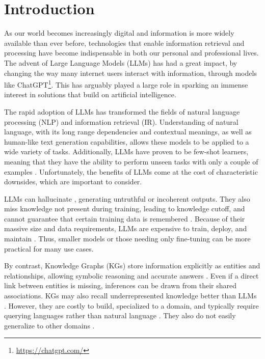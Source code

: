 \documentclass[pdflatex,sn-mathphys-num]{sn-jnl}%
\theoremstyle{thmstyleone}%
\theoremstyle{thmstyletwo}%
\theoremstyle{thmstylethree}%
\begin{document}



\maketitle
\section{Introduction}
\label{sec:intro}

As our world becomes increasingly digital and information is more widely available than ever before, technologies that enable information retrieval and processing have become indispensable in both our personal and professional lives. The advent of Large Language Models (LLMs) has had a great impact, by changing the way many internet users interact with information, through models like ChatGPT\footnote{\url{https://chatgpt.com/}}. This has arguably played a large role in sparking an immense interest in solutions that build on artificial intelligence.

The rapid adoption of LLMs has transformed the fields of natural language processing (NLP) and information retrieval (IR). Understanding of natural language, with its long range dependencies and contextual meanings, as well as human-like text generation capabilities, allows these models to be applied to a wide variety of tasks. Additionally, LLMs have proven to be few-shot learners, meaning that they have the ability to perform unseen tasks with only a couple of examples \cite{Brown2020}. Unfortunately, the benefits of LLMs come at the cost of characteristic downsides, which are important to consider.

LLMs can hallucinate \cite{Ji2023a}, generating untruthful or incoherent outputs. They also miss knowledge not present during training, leading to knowledge cutoff, and cannot guarantee that certain training data is remembered \cite{PanKalo2023}. Because of their massive size and data requirements, LLMs are expensive to train, deploy, and maintain \cite{Bender2021}. Thus, smaller models or those needing only fine-tuning can be more practical for many use cases.

By contrast, Knowledge Graphs (KGs) store information explicitly as entities and relationships, allowing symbolic reasoning and accurate answers \cite{Pan2023}. Even if a direct link between entities is missing, inferences can be drawn from their shared associations. KGs may also recall underrepresented knowledge better than LLMs \cite{PanKalo2023}. However, they are costly to build, specialized to a domain, and typically require querying languages rather than natural language \cite{Yang2023}. They also do not easily generalize to other domains \cite{Pan2023}.
\end{document}
